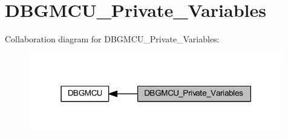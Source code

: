 \hypertarget{group___d_b_g_m_c_u___private___variables}{}\section{D\+B\+G\+M\+C\+U\+\_\+\+Private\+\_\+\+Variables}
\label{group___d_b_g_m_c_u___private___variables}
Collaboration diagram for D\+B\+G\+M\+C\+U\+\_\+\+Private\+\_\+\+Variables\+:
\nopagebreak
\begin{figure}[H]
\begin{center}
\leavevmode
\includegraphics[width=315pt]{group___d_b_g_m_c_u___private___variables}
\end{center}
\end{figure}
